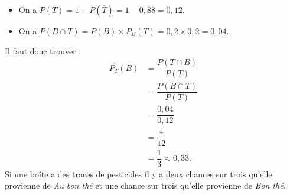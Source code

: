 \begin{itemize}
    \item On a \( P(T) = 1 - P(\overline{T}) = 1 - 0{,}88 = 0{,}12 \).
    \item On a \( P(B \cap T) = P(B) \times P_B(T) = 0{,}2 \times 0{,}2 = 0{,}04 \).
\end{itemize}

Il faut donc trouver :
\begin{align*}
P_T(B) &= \dfrac{P(T \cap B)}{P(T)} \\
&= \dfrac{P(B \cap T)}{P(T)} \\
&= \dfrac{0{,}04}{0{,}12} \\
&= \dfrac{4}{12} \\
&= \dfrac{1}{3} \approx 0{,}33.
\end{align*}
Si une boîte a des traces de pesticides il y a deux chances sur trois qu'elle provienne de \textit{Au bon thé} et une chance sur trois qu'elle provienne de \textit{Bon thé}.
